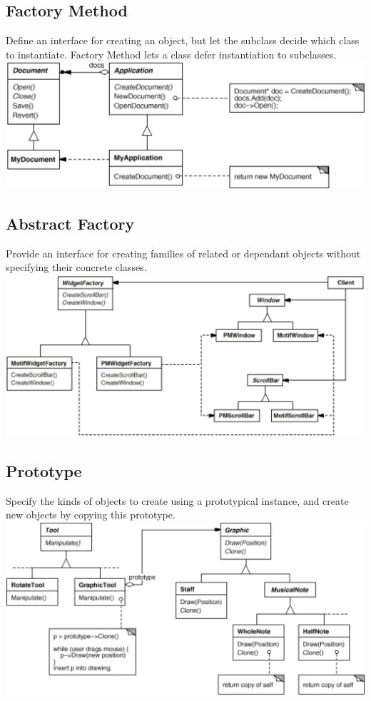 \subsection{Factory Method}
Define an interface for creating an object, but let the subclass decide which class to instantiate. Factory Method lets a class defer instantiation to subclasses.\\
\includegraphics[width=\linewidth]{./img/factory_method.png}

\subsection{Abstract Factory}
Provide an interface for creating families of related or dependant objects without specifying their concrete classes.\\ 
\includegraphics[width=\linewidth]{./img/abstract_factory.png}

\subsection{Prototype}
Specify the kinds of objects to create using a prototypical instance, and create new objects by copying this prototype.\\ 
\includegraphics[width=\linewidth]{./img/prototype.png}

